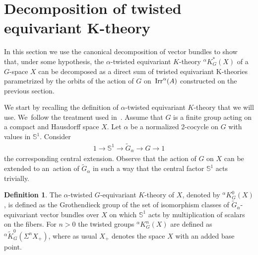 \documentclass[10pt,a4paper]{amsart}
\def\S{\mathbb{S}}
\DeclareMathOperator{\Irr}{\textup{Irr}}
\theoremstyle{definition}
\newtheorem{Def}[Th]{Definition}
\numberwithin{equation}{section}
\begin{document}
%
%


\section[Decomposition of twisted equivariant K-theory]
{Decomposition of twisted equivariant $\boldsymbol K$-theory}\label{Section 3}

In this section we use the canonical decomposition of vector bundles to show that,
under some hypothesis, the $\alpha$-twisted equivariant $K$-theory $^{\alpha}K^{\ast}_{G}(X)$ of a
$G$-space $X$ can be decomposed as a direct sum of twisted equivariant K-theories parametrized
by the orbits of the action of $G$ on~$\Irr^{\alpha}(A)$ constructed on the previous section.

We start by recalling the definition of $\alpha$-twisted equivariant $K$-theory that we will use.
We~fol\-low the treatment used in~\cite[Section 7.2]{AdemRuan}.
Assume that $G$ is a finite group acting on a compact and Hausdorff space $X$.
Let $\alpha$ be a normalized 2-cocycle on $G$ with values in $\S^{1}$. Consider
\begin{gather*}
1\rightarrow \S^{1}\rightarrow \widetilde{G}_{\alpha}\rightarrow G\rightarrow 1
\end{gather*}
the corresponding central extension. Observe that the action of $G$ on $X$ can be
extended to an~action of $\widetilde{G}_{\alpha}$ in such a way that the central factor $\S^{1}$
acts trivially.

\begin{Def}\label{usualdeftwisted}
The $\alpha$-twisted $G$-equivariant $K$-theory of $X$, denoted by $^{\alpha}K_{G}^{0}(X)$,
is defined as the Grothendieck group of the set of isomorphism classes of
$\widetilde{G}_{\alpha}$-equivariant vector bundles over $X$ on which
$\S^{1}$ acts by multiplication of scalars on the fibers. For $n>0$ the twisted groups
$^{\alpha}K_{G}^{n}(X)$ are defined as
$^{\alpha}\tilde{K}_{G}^{0}(\Sigma^{n}X_{+})$, where as usual $X_{+}$
denotes the space $X$ with an added base point.
\end{Def}
\end{document}
